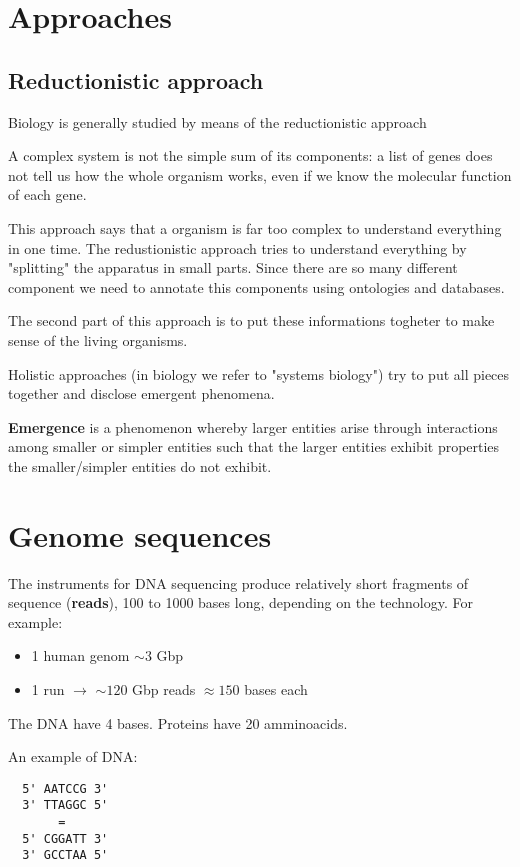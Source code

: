 \section{Approaches}
\subsection{Reductionistic approach}

Biology is generally studied by means of the reductionistic approach

A complex system is not the simple sum of its components: a list of genes 
does not tell us how the whole organism works, even if we know the molecular 
function of each gene.

This approach says that a organism is far too complex to understand everything
in one time. The redustionistic approach tries to understand everything by
"splitting" the apparatus in small parts. Since there are so many different
component we need to annotate this components using ontologies and databases.

The second part of this approach is to put these informations togheter to make
sense of the living organisms.

Holistic approaches (in biology we refer to "systems biology") try to put 
all pieces together and disclose emergent phenomena.

\textbf{Emergence} is a phenomenon whereby larger entities arise through interactions 
among smaller or simpler entities such that the larger entities exhibit properties 
the smaller/simpler entities do not exhibit.

\section{Genome sequences}
The instruments for DNA sequencing produce relatively short fragments of
sequence (\textbf{reads}), 100 to 1000 bases long, depending on the technology.
For example:
\begin{itemize}
  \item 1 human genom $\sim3$ Gbp
  \item 1 run $\to$ $\sim120$ Gbp reads $\approx150$ bases each
\end{itemize}

The DNA have 4 bases.
Proteins have 20 amminoacids.

An example of DNA:
\begin{verbatim}
  5' AATCCG 3'
  3' TTAGGC 5'
       =
  5' CGGATT 3'
  3' GCCTAA 5'
\end{verbatim}
